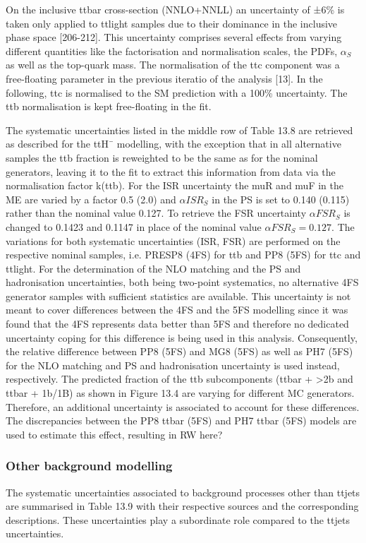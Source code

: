 On the inclusive ttbar cross-section (NNLO+NNLL) an uncertainty of ±6\% is taken only applied to ttlight samples due to their dominance in the inclusive phase space [206-212]. This uncertainty comprises several effects from varying different quantities like the factorisation and normalisation scales, the PDFs, $\alpha_S$ as well as the top-quark mass.
The normalisation of the ttc component was a free-floating parameter in the previous iteratio of the analysis [13]. In the following, ttc is normalised to the SM prediction with a 100\% uncertainty. The ttb normalisation is kept free-floating in the fit.

The systematic uncertainties listed in the middle row of Table 13.8 are retrieved as described for the ttH¯ modelling, with the exception that in all alternative samples the ttb fraction is reweighted to be the same as for the nominal generators, leaving it to the fit to extract this information from data via the normalisation factor k(ttb). For the ISR uncertainty the muR and muF in the ME are varied by a factor 0.5 (2.0) and $\alpha ISR_{S}$
in the PS is set to 0.140 (0.115) rather than the nominal value 0.127. To retrieve the FSR uncertainty $\alpha FSR_{S}$ is changed to 0.1423 and 0.1147 in place of the nominal value $\alpha FSR_{S} = 0.127$. The variations for both systematic uncertainties (ISR, FSR) are
performed on the respective nominal samples, i.e. PRESP8 (4FS) for ttb
and PP8 (5FS) for ttc and ttlight. For the determination of the NLO
matching and the PS and hadronisation uncertainties, both being two-point systematics, no
 alternative 4FS generator samples with sufficient statistics are available. This 
 uncertainty is not meant to cover differences between the 4FS and the 5FS modelling since
  it was found that the 4FS represents data better than 5FS and therefore no dedicated uncertainty coping for this difference is being used in this analysis. Consequently, the 
  relative difference between PP8 (5FS) and MG8 (5FS) as well as PH7 (5FS) for the NLO 
  matching and PS and hadronisation uncertainty is used instead, respectively.
The predicted fraction of the ttb subcomponents (ttbar + >2b and ttbar + 1b/1B) as shown in
Figure 13.4 are varying for different MC generators. Therefore, an additional uncertainty
 is associated to account for these differences. The discrepancies between the PP8
ttbar (5FS) and PH7 ttbar (5FS) models are used to estimate this effect, 
resulting in RW here?
\subsubsection{Other background modelling}

The systematic uncertainties associated to background processes other than ttjets are summarised in Table 13.9 with their respective sources and the corresponding descriptions. These uncertainties play a subordinate role compared to the ttjets uncertainties.
